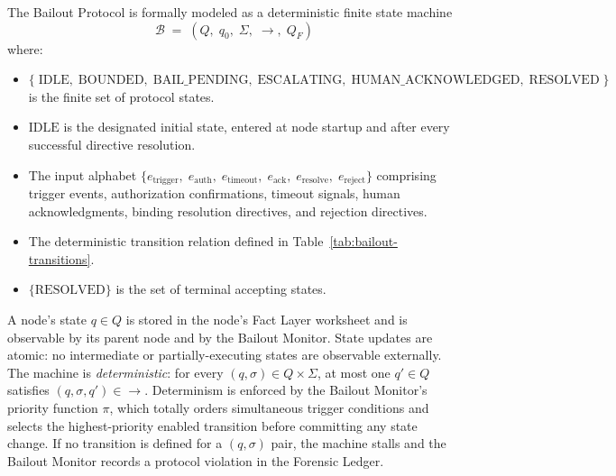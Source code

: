 The Bailout Protocol is formally modeled as a deterministic finite state machine
\begin{equation}
\mathcal{B} \;=\; (Q,\; q_0,\; \Sigma,\; \rightarrow,\; Q_F) \tag{BM}
\end{equation}
where:

\begin{itemize}\itemsep=0pt
\item[$Q$] $\{\;\text{IDLE},\; \text{BOUNDED},\; \text{BAIL\_PENDING},\; \text{ESCALATING},\; \text{HUMAN\_ACKNOWLEDGED},\; \text{RESOLVED}\;\}$ is the finite set of protocol states.
\item[$q_0$] $\text{IDLE}$ is the designated initial state, entered at node startup and after every successful directive resolution.
\item[$\Sigma$] The input alphabet $\{e_{\text{trigger}},\; e_{\text{auth}},\; e_{\text{timeout}},\; e_{\text{ack}},\; e_{\text{resolve}},\; e_{\text{reject}}\}$ comprising trigger events, authorization confirmations, timeout signals, human acknowledgments, binding resolution directives, and rejection directives.
\item[$\rightarrow\; \subseteq Q \times \Sigma \times Q$] The deterministic transition relation defined in Table~\ref{tab:bailout-transitions}.
\item[$Q_F$] $\{\text{RESOLVED}\}$ is the set of terminal accepting states.
\end{itemize}

A node's state $q \in Q$ is stored in the node's Fact Layer worksheet and is observable by its parent node and by the Bailout Monitor. State updates are atomic: no intermediate or partially-executing states are observable externally. The machine is \emph{deterministic}: for every $(q, \sigma) \in Q \times \Sigma$, at most one $q' \in Q$ satisfies $(q, \sigma, q') \in \rightarrow$. Determinism is enforced by the Bailout Monitor's priority function $\pi$, which totally orders simultaneous trigger conditions and selects the highest-priority enabled transition before committing any state change. If no transition is defined for a $(q, \sigma)$ pair, the machine stalls and the Bailout Monitor records a protocol violation in the Forensic Ledger.

